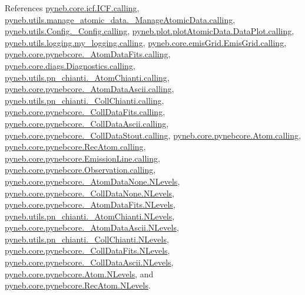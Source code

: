 References \hyperlink{icf_8py_source_l00016}{pyneb.\-core.\-icf.\-I\-C\-F.\-calling}, \hyperlink{manage__atomic__data_8py_source_l00018}{pyneb.\-utils.\-manage\-\_\-atomic\-\_\-data.\-\_\-\-Manage\-Atomic\-Data.\-calling}, \hyperlink{_config_8py_source_l00032}{pyneb.\-utils.\-Config.\-\_\-\-Config.\-calling}, \hyperlink{plot_atomic_data_8py_source_l00042}{pyneb.\-plot.\-plot\-Atomic\-Data.\-Data\-Plot.\-calling}, \hyperlink{logging_8py_source_l00044}{pyneb.\-utils.\-logging.\-my\-\_\-logging.\-calling}, \hyperlink{emis_grid_8py_source_l00044}{pyneb.\-core.\-emis\-Grid.\-Emis\-Grid.\-calling}, \hyperlink{pynebcore_8py_source_l00097}{pyneb.\-core.\-pynebcore.\-\_\-\-Atom\-Data\-Fits.\-calling}, \hyperlink{diags_8py_source_l00169}{pyneb.\-core.\-diags.\-Diagnostics.\-calling}, \hyperlink{pn__chianti_8py_source_l00240}{pyneb.\-utils.\-pn\-\_\-chianti.\-\_\-\-Atom\-Chianti.\-calling}, \hyperlink{pynebcore_8py_source_l00318}{pyneb.\-core.\-pynebcore.\-\_\-\-Atom\-Data\-Ascii.\-calling}, \hyperlink{pn__chianti_8py_source_l00434}{pyneb.\-utils.\-pn\-\_\-chianti.\-\_\-\-Coll\-Chianti.\-calling}, \hyperlink{pynebcore_8py_source_l00585}{pyneb.\-core.\-pynebcore.\-\_\-\-Coll\-Data\-Fits.\-calling}, \hyperlink{pynebcore_8py_source_l00936}{pyneb.\-core.\-pynebcore.\-\_\-\-Coll\-Data\-Ascii.\-calling}, \hyperlink{pynebcore_8py_source_l01156}{pyneb.\-core.\-pynebcore.\-\_\-\-Coll\-Data\-Stout.\-calling}, \hyperlink{pynebcore_8py_source_l01229}{pyneb.\-core.\-pynebcore.\-Atom.\-calling}, \hyperlink{pynebcore_8py_source_l02643}{pyneb.\-core.\-pynebcore.\-Rec\-Atom.\-calling}, \hyperlink{pynebcore_8py_source_l03385}{pyneb.\-core.\-pynebcore.\-Emission\-Line.\-calling}, \hyperlink{pynebcore_8py_source_l03541}{pyneb.\-core.\-pynebcore.\-Observation.\-calling}, \hyperlink{pynebcore_8py_source_l00069}{pyneb.\-core.\-pynebcore.\-\_\-\-Atom\-Data\-None.\-N\-Levels}, \hyperlink{pynebcore_8py_source_l00082}{pyneb.\-core.\-pynebcore.\-\_\-\-Coll\-Data\-None.\-N\-Levels}, \hyperlink{pynebcore_8py_source_l00098}{pyneb.\-core.\-pynebcore.\-\_\-\-Atom\-Data\-Fits.\-N\-Levels}, \hyperlink{pn__chianti_8py_source_l00242}{pyneb.\-utils.\-pn\-\_\-chianti.\-\_\-\-Atom\-Chianti.\-N\-Levels}, \hyperlink{pynebcore_8py_source_l00319}{pyneb.\-core.\-pynebcore.\-\_\-\-Atom\-Data\-Ascii.\-N\-Levels}, \hyperlink{pn__chianti_8py_source_l00435}{pyneb.\-utils.\-pn\-\_\-chianti.\-\_\-\-Coll\-Chianti.\-N\-Levels}, \hyperlink{pynebcore_8py_source_l00586}{pyneb.\-core.\-pynebcore.\-\_\-\-Coll\-Data\-Fits.\-N\-Levels}, \hyperlink{pynebcore_8py_source_l00933}{pyneb.\-core.\-pynebcore.\-\_\-\-Coll\-Data\-Ascii.\-N\-Levels}, \hyperlink{pynebcore_8py_source_l01231}{pyneb.\-core.\-pynebcore.\-Atom.\-N\-Levels}, and \hyperlink{pynebcore_8py_source_l02661}{pyneb.\-core.\-pynebcore.\-Rec\-Atom.\-N\-Levels}.



